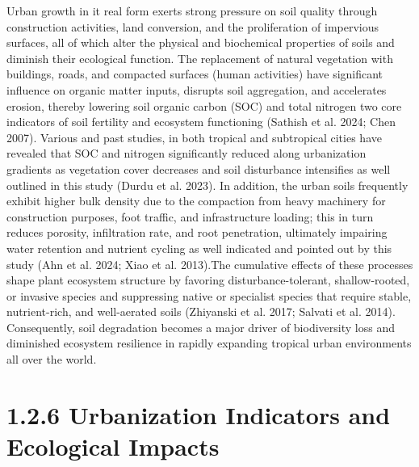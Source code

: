 Urban growth in it real form exerts strong pressure on soil quality through construction activities, land conversion, and the proliferation of impervious surfaces, all of which alter the physical and biochemical properties of soils and diminish their ecological function. The replacement of natural vegetation with buildings, roads, and compacted surfaces (human activities) have significant influence on organic matter inputs, disrupts soil aggregation, and accelerates erosion, thereby lowering soil organic carbon (SOC) and total nitrogen two core indicators of soil fertility and ecosystem functioning (Sathish et al. 2024; Chen 2007). Various and past studies, in both tropical and subtropical cities have revealed that SOC and nitrogen significantly reduced along urbanization gradients as vegetation cover decreases and soil disturbance intensifies as well outlined in this study (Durdu et al. 2023). In addition, the urban soils frequently exhibit higher bulk density due to the compaction from heavy machinery for construction purposes, foot traffic, and infrastructure loading; this in turn reduces porosity, infiltration rate, and root penetration, ultimately impairing water retention and nutrient cycling as well indicated and pointed out by this study (Ahn et al. 2024; Xiao et al. 2013).The cumulative effects of these processes shape plant ecosystem structure by favoring disturbance-tolerant, shallow-rooted, or invasive species and suppressing native or specialist species that require stable, nutrient-rich, and well-aerated soils (Zhiyanski et al. 2017; Salvati et al. 2014). Consequently, soil degradation becomes a major driver of biodiversity loss and diminished ecosystem resilience in rapidly expanding tropical urban environments all over the world.
\hypertarget{urbanization-indicators-and-ecological-impacts}{%
\section{\texorpdfstring{\textbf{1.2.6 Urbanization Indicators and Ecological Impacts}}{1.2.6 Urbanization Indicators and Ecological Impacts}}\label{urbanization-indicators-and-ecological-impacts}}

